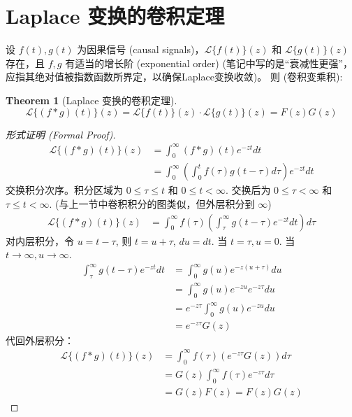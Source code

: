 \documentclass[linespread=1.5,openany]{book}%
\def\diff{d}%
\theoremstyle{plain}
\newtheorem{theorem}{Theorem}
\newcommand{\diff}{\mathop{}\!\mathrm{d}}  %
\begin{document}
{{{{{							\section{Laplace 变换的卷积定理 }
							{ %
								设 $f(t), g(t)$ 为因果信号 (causal signals)，$\mathcal{L}\{f(t)\}(z)$ 和 $\mathcal{L}\{g(t)\}(z)$ 存在，且 $f, g$ 有适当的增长阶 (exponential order) (笔记中写的是“衰减性更强”，应指其绝对值被指数函数所界定，以确保Laplace变换收敛)。
								则 (卷积变乘积):
								\begin{theorem}[Laplace 变换的卷积定理] \label{thm:L15_laplace_convolution}
									\[ \mathcal{L}\{(f*g)(t)\}(z) = \mathcal{L}\{f(t)\}(z) \cdot \mathcal{L}\{g(t)\}(z) = F(z)G(z) \]
								\end{theorem}
								\begin{proof}[形式证明 (Formal Proof)]
									\begin{align*}
										\mathcal{L}\{(f*g)(t)\}(z) &= \int_{0}^{\infty} (f*g)(t) e^{-zt} \diff t  \\
										&= \int_{0}^{\infty} \left( \int_{0}^{t} f(\tau)g(t-\tau) \diff \tau \right) e^{-zt} \diff t
									\end{align*}
									交换积分次序。积分区域为 $0 \le \tau \le t$ 和 $0 \le t < \infty$.
									交换后为 $0 \le \tau < \infty$ 和 $\tau \le t < \infty$.
									(与上一节中卷积积分的图类似，但外层积分到 $\infty$)
									\begin{align*}
										\mathcal{L}\{(f*g)(t)\}(z) &= \int_{0}^{\infty} f(\tau) \left( \int_{\tau}^{\infty} g(t-\tau)e^{-zt} \diff t \right) \diff \tau
									\end{align*}
									对内层积分，令 $u = t-\tau$, 则 $t = u+\tau$, $\diff u = \diff t$.
									当 $t=\tau, u=0$. 当 $t\to\infty, u\to\infty$.
									\begin{align*}
										\int_{\tau}^{\infty} g(t-\tau)e^{-zt} \diff t &= \int_{0}^{\infty} g(u)e^{-z(u+\tau)} \diff u \\
										&= \int_{0}^{\infty} g(u)e^{-zu}e^{-z\tau} \diff u \\
										&= e^{-z\tau} \int_{0}^{\infty} g(u)e^{-zu} \diff u \\
										&= e^{-z\tau} G(z)
									\end{align*}
									代回外层积分：
									\begin{align*}
										\mathcal{L}\{(f*g)(t)\}(z) &= \int_{0}^{\infty} f(\tau) \left( e^{-z\tau} G(z) \right) \diff \tau \\
										&= G(z) \int_{0}^{\infty} f(\tau)e^{-z\tau} \diff \tau \\
										&= G(z)F(z) = F(z)G(z)
									\end{align*}
								\end{proof}
								\vspace{\baselineskip}
								
}}}}}}
\end{document}

